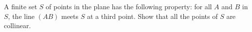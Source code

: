 A finite set $S$ of points in the plane has the following property: for all $A$ and $B$ in $S$, the line $(AB)$ meets $S$ at a third point. Show that all the points of $S$ are collinear.
